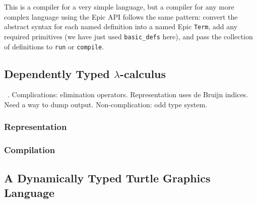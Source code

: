 \noindent
This is a compiler for a very simple language, but a compiler for any
more complex language using the Epic API follows the same pattern:
convert the abstract syntax for each named definition into a named Epic
\texttt{Term}, add any required primitives (we have just used
\texttt{basic\_defs} here), and pass the collection of definitions to
\texttt{run} or \texttt{compile}.

\subsection{Dependently Typed $\lambda$-calculus}

\LamPi{}~\cite{simply-easy}. Complications: elimination
operators. Representation uses de Bruijn indices. Need a way to dump
output. Non-complication: odd type system.

\subsubsection{Representation}

\subsubsection{Compilation}

\subsection{A Dynamically Typed Turtle Graphics Language}



